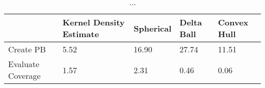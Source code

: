 \begin{table}[ht!]
\centering
\caption{...} 
\label{tab:comp_time_summary}
\begin{tabular}{R{1.5in}L{1.1in}L{.95in}L{.95in}L{.95in}}
  \hline
\hline
  & Kernel Density Estimate & Spherical & Delta Ball & Convex Hull \\ 
  \hline
Create PB &  5.52 & 16.90 & 27.74 & 11.51 \\ 
  Evaluate Coverage & 1.57 & 2.31 & 0.46 & 0.06 \\ 
   \hline
\end{tabular}
\end{table}
